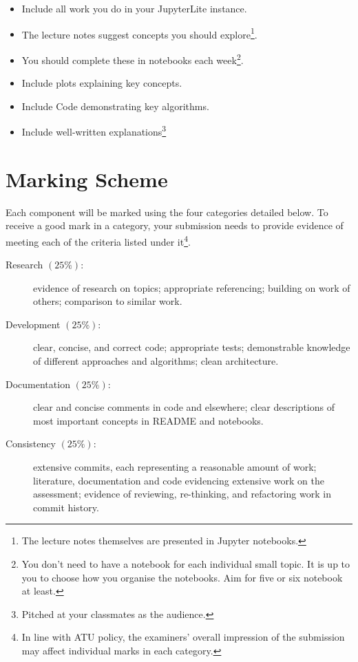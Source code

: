 \documentclass[a4paper]{tufte-handout}
\begin{document}
\begin{itemize}
  \item Include all work you do in your JupyterLite instance.
  \item The lecture notes suggest concepts you should explore\footnote{The lecture notes themselves are presented in Jupyter notebooks.}.
  \item You should complete these in notebooks each week\footnote{You don't need to have a notebook for each individual small topic. It is up to you to choose how you organise the notebooks. Aim for five or six notebook at least.}.
  \item Include plots explaining key concepts.
  \item Include Code demonstrating key algorithms.
  \item Include well-written explanations\footnote{Pitched at your classmates as the audience.}
\end{itemize} 


\section{Marking Scheme}
Each component will be marked using the four categories detailed below.
To receive a good mark in a category, your submission needs to provide evidence of meeting each of the criteria listed under it\footnote{In line with ATU policy, the examiners' overall impression of the submission may affect individual marks in each category.}.


\begin{description}
  \item[Research $(25\%)$:] evidence of research on topics; appropriate referencing; building on work of others; comparison to similar work.
  \item[Development $(25\%)$:] clear, concise, and correct code; appropriate tests; demonstrable knowledge of different approaches and algorithms; clean architecture.
  \item[Documentation $(25\%)$:] clear and concise comments in code and elsewhere; clear descriptions of most important concepts in README and notebooks. 
  \item[Consistency $(25\%)$:] extensive commits, each representing a reasonable amount of work; literature, documentation and code evidencing extensive work on the assessment; evidence of reviewing, re-thinking, and refactoring work in commit history.
\end{description}
\end{document}
